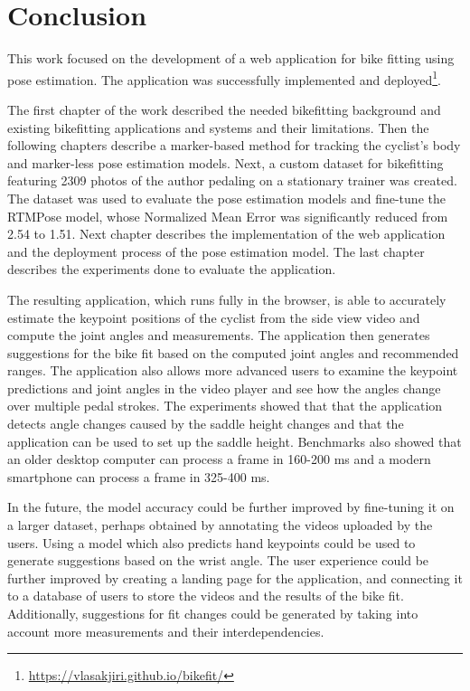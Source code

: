 
\chapter{Conclusion}
\label{conclusion}

This work focused on the development of a web application for bike fitting using pose estimation. The application was successfully implemented and deployed\footnote{\url{https://vlasakjiri.github.io/bikefit/}}.

The first chapter of the work described the needed bikefitting background and existing bikefitting applications and systems and their limitations. Then the following chapters describe a marker-based method for tracking the cyclist's body and marker-less pose estimation models. Next, a custom dataset for bikefitting featuring 2309 photos of the author pedaling on a stationary trainer was created. The dataset was used to evaluate the pose estimation models and fine-tune the RTMPose model, whose Normalized Mean Error was significantly reduced from 2.54 to 1.51. Next chapter describes the implementation of the web application and the deployment process of the pose estimation model. The last chapter describes the experiments done to evaluate the application.

The resulting application, which runs fully in the browser, is able to accurately estimate the keypoint positions of the cyclist from the side view video and compute the joint angles and measurements. The application then generates suggestions for the bike fit based on the computed joint angles and recommended ranges. The application also allows more advanced users to examine the keypoint predictions and joint angles in the video player and see how the angles change over multiple pedal strokes. The experiments showed that that the application detects angle changes caused by the saddle height changes and that the application can be used to set up the saddle height. Benchmarks also showed that an older desktop computer can process a frame in 160-200 ms and a modern smartphone can process a frame in 325-400 ms.

In the future, the model accuracy could be further improved by fine-tuning it on a larger dataset, perhaps obtained by annotating the videos uploaded by the users. Using a model which also predicts hand keypoints could be used to generate suggestions based on the wrist angle. The user experience could be further improved by creating a landing page for the application, and connecting it to a database of users to store the videos and the results of the bike fit. Additionally, suggestions for fit changes could be generated by taking into account more measurements and their interdependencies.



% 